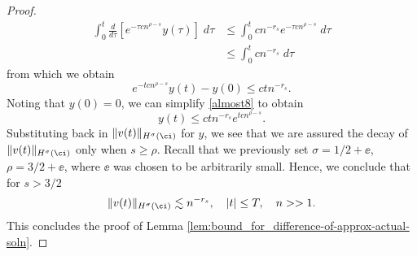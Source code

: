 \begin{proof}
\begin{equation*}
	\begin{split}
	\int_0^t  \frac{d}{d \tau} \left[ e^{-\tau cn^{\rho - s}} y(\tau)
	\right] \; d \tau
	& \le \int_0^t  c n^{-r_s} e^{-\tau cn^{\rho - s}}  \; d \tau
	\\
	& \le \int_0^t cn^{-r_s} \; d \tau
\end{split}
\end{equation*}
from which we obtain
\begin{equation}
	\label{almost8}
	e^{-tcn^{\rho - s}} y(t) - y(0) \le ctn^{-r_s}.
\end{equation}
Noting that $y(0)=0$, we can simplify \eqref{almost8} to obtain
\begin{equation}
	\label{gronwall-ineq8}
	y(t) \le ctn^{-r_s} e^{tcn^{\rho - s}}.
\end{equation}
Substituting back in $\|v(t)\|_{H^\sigma(\ci)}$ for $y$, we see that we are assured the
decay of $\|v(t)\|_{H^\sigma(\ci)}$ only when $s \ge \rho$. Recall that
we previously set $\sigma = 1/2 + \ee$, $\rho = 3/2 + \ee$, where $\ee$ was
chosen to be arbitrarily small. Hence, we conclude that for $s>3/2$
\begin{equation}
	\label{en-est-fin!8}
	\|v(t)\|_{H^\sigma(\ci)} 
	\lesssim
	n^{-r_s}, \quad |t| \le T,\quad n>>1 . 
\end{equation}
This concludes the proof of Lemma
\ref{lem:bound_for_difference-of-approx-actual-soln}.
\end{proof}
%
%
%
%
